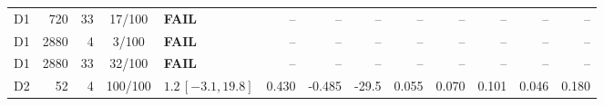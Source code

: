\begin{longtable}{crrcp{33mm}rrrrrrrr}
D1 & 720 & 33 & 17/100 & \textbf{FAIL} & -- & -- & -- & -- & -- & -- & -- & --\\
D1 & 2880 & 4 & 3/100 & \textbf{FAIL} & -- & -- & -- & -- & -- & -- & -- & --\\
D1 & 2880 & 33 & 32/100 & \textbf{FAIL} & -- & -- & -- & -- & -- & -- & -- & --\\
D2 & 52 & 4 & 100/100 & \(1.2\,[-3.1,19.8]\) & 0.430 & -0.485 & -29.5 & 0.055 & 0.070 & 0.101 & 0.046 & 0.180\\

\end{longtable}
